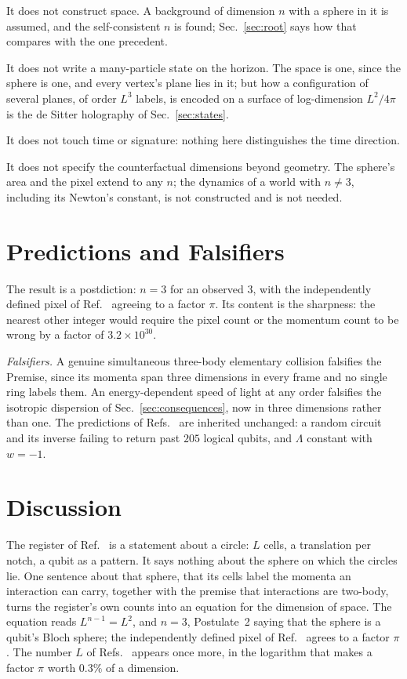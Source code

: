 \documentclass[aps,prd,twocolumn,superscriptaddress,nofootinbib]{revtex4-2}
\begin{document}
It does not construct space. A background of dimension $n$ with a sphere in it is assumed, and the self-consistent $n$ is found; Sec.~\ref{sec:root} says how that compares with the one precedent.

It does not write a many-particle state on the horizon. The space is one, since the sphere is one, and every vertex's plane lies in it; but how a configuration of several planes, of order $L^3$ labels, is encoded on a surface of log-dimension $L^2/4\pi$ is the de Sitter holography of Sec.~\ref{sec:states}.

It does not touch time or signature: nothing here distinguishes the time direction.

It does not specify the counterfactual dimensions beyond geometry. The sphere's area and the pixel extend to any $n$; the dynamics of a world with $n \ne 3$, including its Newton's constant, is not constructed and is not needed.

\section{Predictions and Falsifiers}
\label{sec:pred}

The result is a postdiction: $n = 3$ for an observed $3$, with the independently defined pixel of Ref.~\cite{korytko2026} agreeing to a factor $\pi$. Its content is the sharpness: the nearest other integer would require the pixel count or the momentum count to be wrong by a factor of $3.2\times10^{30}$.

\textit{Falsifiers.} A genuine simultaneous three-body elementary collision falsifies the Premise, since its momenta span three dimensions in every frame and no single ring labels them. An energy-dependent speed of light at any order falsifies the isotropic dispersion of Sec.~\ref{sec:consequences}, now in three dimensions rather than one. The predictions of Refs.~\cite{korytko2026,korytko2026c} are inherited unchanged: a random circuit and its inverse failing to return past $205$ logical qubits, and $\Lambda$ constant with $w = -1$.

\section{Discussion}
\label{sec:discussion}

The register of Ref.~\cite{korytko2026c} is a statement about a circle: $L$ cells, a translation per notch, a qubit as a pattern. It says nothing about the sphere on which the circles lie. One sentence about that sphere, that its cells label the momenta an interaction can carry, together with the premise that interactions are two-body, turns the register's own counts into an equation for the dimension of space. The equation reads $L^{n-1} = L^2$, and $n = 3$, Postulate~2 saying that the sphere is a qubit's Bloch sphere; the independently defined pixel of Ref.~\cite{korytko2026} agrees to a factor $\pi$. The number $L$ of Refs.~\cite{korytko2026,korytko2026b,korytko2026c} appears once more, in the logarithm that makes a factor $\pi$ worth $0.3\%$ of a dimension.
\end{document}
